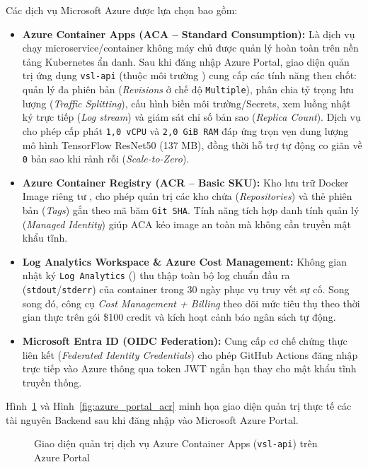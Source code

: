 Các dịch vụ Microsoft Azure được lựa chọn bao gồm:
\begin{itemize}
    \item \textbf{Azure Container Apps (ACA -- Standard Consumption):} Là dịch vụ chạy microservice/container không máy chủ được quản lý hoàn toàn trên nền tảng Kubernetes ẩn danh. Sau khi đăng nhập Azure Portal, giao diện quản trị ứng dụng \texttt{vsl-api} (thuộc môi trường ) cung cấp các tính năng then chốt: quản lý đa phiên bản (\textit{Revisions} ở chế độ \texttt{Multiple}), phân chia tỷ trọng lưu lượng (\textit{Traffic Splitting}), cấu hình biến môi trường/Secrets, xem luồng nhật ký trực tiếp (\textit{Log stream}) và giám sát chỉ số bản sao (\textit{Replica Count}). Dịch vụ cho phép cấp phát \texttt{1,0 vCPU} và \texttt{2,0 GiB RAM} đáp ứng trọn vẹn dung lượng mô hình TensorFlow ResNet50 (137 MB), đồng thời hỗ trợ tự động co giãn về \texttt{0} bản sao khi rảnh rỗi (\textit{Scale-to-Zero}).
    \item \textbf{Azure Container Registry (ACR -- Basic SKU):} Kho lưu trữ Docker Image riêng tư , cho phép quản trị các kho chứa (\textit{Repositories}) và thẻ phiên bản (\textit{Tags}) gắn theo mã băm \texttt{Git SHA}. Tính năng tích hợp danh tính quản lý (\textit{Managed Identity}) giúp ACA kéo image an toàn mà không cần truyền mật khẩu tĩnh.
    \item \textbf{Log Analytics Workspace \& Azure Cost Management:} Không gian nhật ký \texttt{Log Analytics} () thu thập toàn bộ log chuẩn đầu ra (\texttt{stdout}/\texttt{stderr}) của container trong 30 ngày phục vụ truy vết sự cố. Song song đó, công cụ \textit{Cost Management + Billing} theo dõi mức tiêu thụ theo thời gian thực trên gói \$100 credit và kích hoạt cảnh báo ngân sách tự động.
    \item \textbf{Microsoft Entra ID (OIDC Federation):} Cung cấp cơ chế chứng thực liên kết (\textit{Federated Identity Credentials}) cho phép GitHub Actions đăng nhập trực tiếp vào Azure thông qua token JWT ngắn hạn thay cho mật khẩu tĩnh truyền thống.
\end{itemize}

Hình~\ref{fig:azure_portal_aca} và Hình~\ref{fig:azure_portal_acr} minh họa giao diện quản trị thực tế các tài nguyên Backend sau khi đăng nhập vào Microsoft Azure Portal.

\begin{figure}[H]
\centering
{}
\caption{Giao diện quản trị dịch vụ Azure Container Apps (\texttt{vsl-api}) trên Azure Portal}
\label{fig:azure_portal_aca}
\end{figure}

